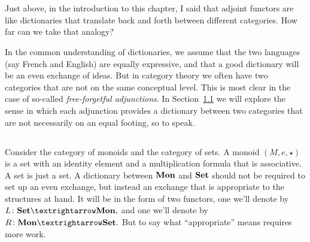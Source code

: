 \documentclass[../main/CT4S-EN-RU]{subfiles}
\begin{document}
\section{}

\begin{blockENG}
Just above, in the introduction to this chapter, I said that adjoint functors are like dictionaries that translate back and forth between different categories. How far can we take that analogy?
\end{blockENG}

\begin{blockRUS}
\end{blockRUS}

\begin{blockENG}
In the common understanding of dictionaries, we assume that the two languages (say French and English) are equally expressive, and that a good dictionary will be an even exchange of ideas. But in category theory we often have two categories that are not on the same conceptual level. This is most clear in the case of so-called {\em free-forgetful adjunctions}. In Section~\ref{sec:adjoints discuss and define} we will explore the sense in which each adjunction provides a dictionary between two categories that are not necessarily on an equal footing, so to speak.
\end{blockENG}

\begin{blockRUS}
\end{blockRUS}


\subsection{}\label{sec:adjoints discuss and define}

\begin{blockENG}
Consider the category of monoids and the category of sets. A monoid $(M,e,{⋆})$ is a set with an identity element and a multiplication formula that is associative. A set is just a set. A dictionary between ${\mathbf{Mon}}$ and ${\mathbf{Set}}$ should not be required to set up an even exchange, but instead an exchange that is appropriate to the structures at hand. It will be in the form of two functors, one we'll denote by $L\colon\Set{→}\Mon,$ and one we'll denote by $R\colon\Mon{→}\Set.$ But to say what “appropriate” means requires more work.
\end{blockENG}
\end{document}
